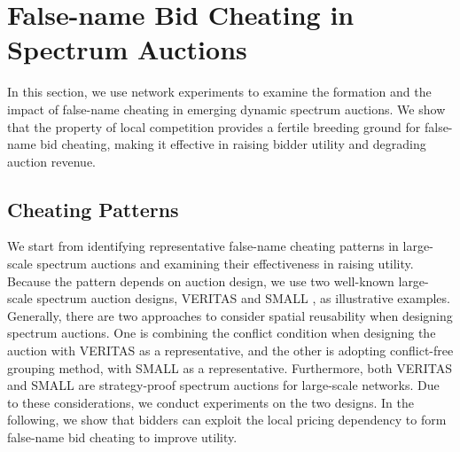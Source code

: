 \documentclass{sig-alternate}
\begin{document}
\section{False-name Bid Cheating in Spectrum Auctions}
In this section, we use network experiments to examine the formation and the impact of false-name cheating in emerging dynamic spectrum auctions. We show that the property of local competition provides a fertile breeding ground for false-name bid cheating, making it effective in raising bidder utility and degrading auction revenue.


\subsection{Cheating Patterns}
We start from identifying representative false-name cheating patterns in large-scale spectrum auctions and examining their effectiveness in raising utility. Because the pattern depends on auction design, we use two well-known large-scale spectrum auction designs, VERITAS \cite{Mobicom08:Zhou} and SMALL \cite{Wu:Info:11}, as illustrative examples. Generally, there are two approaches to consider spatial reusability when designing spectrum auctions. One is combining the conflict condition when designing the auction with VERITAS as a representative, and the other is  adopting conflict-free grouping method, with SMALL as a representative. Furthermore, both VERITAS and SMALL are strategy-proof spectrum auctions for large-scale networks. Due to these considerations, we conduct experiments on the two designs.
In the following, we show that bidders can exploit the local pricing dependency to form false-name bid cheating to improve utility.
\end{document}

